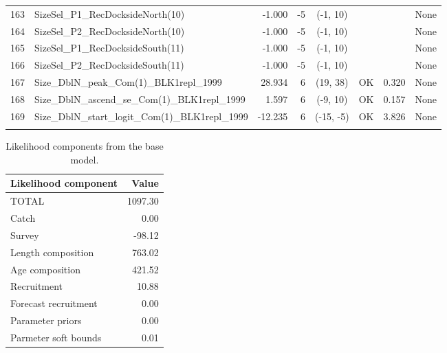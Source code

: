 \documentclass[12pt,]{article}
\begin{document}
\begin{landscape}
\begin{longtable}{rlrrcccl}
  163 & SizeSel\_P1\_RecDocksideNorth(10) & -1.000 & -5 & (-1, 10) &  &  & None \\ 
  164 & SizeSel\_P2\_RecDocksideNorth(10) & -1.000 & -5 & (-1, 10) &  &  & None \\ 
  165 & SizeSel\_P1\_RecDocksideSouth(11) & -1.000 & -5 & (-1, 10) &  &  & None \\ 
  166 & SizeSel\_P2\_RecDocksideSouth(11) & -1.000 & -5 & (-1, 10) &  &  & None \\ 
  167 & Size\_DblN\_peak\_Com(1)\_BLK1repl\_1999 & 28.934 & 6 & (19, 38) & OK & 0.320 & None \\ 
  168 & Size\_DblN\_ascend\_se\_Com(1)\_BLK1repl\_1999 & 1.597 & 6 & (-9, 10) & OK & 0.157 & None \\ 
  169 & Size\_DblN\_start\_logit\_Com(1)\_BLK1repl\_1999 & -12.235 & 6 & (-15, -5) & OK & 3.826 & None \\ 
   \hline
\hline
\label{tab:model_params}
\end{longtable}
\end{landscape}

\FloatBarrier

\begin{table}[ht]
\centering
\caption{Likelihood components from the base model.} 
\label{tab:like_components}
\begin{tabular}{lr}
  \hline
Likelihood component & Value \\ 
  \hline
TOTAL & 1097.30 \\ 
  Catch & 0.00 \\ 
  Survey & -98.12 \\ 
  Length composition & 763.02 \\ 
  Age composition & 421.52 \\ 
  Recruitment & 10.88 \\ 
  Forecast recruitment & 0.00 \\ 
  Parameter priors & 0.00 \\ 
  Parmeter soft bounds & 0.01 \\ 
   \hline
\end{tabular}
\end{table}

\newpage
\end{document}
